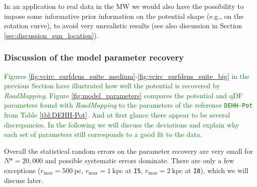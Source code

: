 \documentclass[iop,revtex4,numberedappendix,appendixfloats]{emulateapj}
\newcommand{\RM}{{\sl RoadMapping}}
\newcommand{\NEW}[1]{\textcolor{Green}{#1}}
\newcommand{\hiddenComment}[1]{}
\newcommand{\OLD}[1]{}
\begin{document}
In an application to real data in the MW we would also have the possibility to impose some informative prior information on the potential shape (e.g., on the rotation curve), to avoid very unrealistic results (see also discussion in Section \ref{sec:discussion_sun_location}).

\hiddenComment{[TO DO: Jo writes: "It would be interesting to figure out a little more how we can determine whether we expect the fit to be strongly biased because we are using a volume that it sitting right on top of a massive spiral arm, although that is perhaps best kept for a later paper."]}

\subsubsection{Discussion of the model parameter recovery} \label{sec:parameter recovery}

\NEW{Figures \ref{fig:vcirc_surfdens_suite_medium}-\ref{fig:vcirc_surfdens_suite_big} in the previous Section have illustrated how well the potential is recovered by \RM{}. Figure \ref{fig:model_parameters} compares the potential and qDF parameters found with \RM{} to the parameters of the reference \texttt{DEHH-Pot} from Table \ref{tbl:DEHH-Pot}. And at first glance there appear to be several discrepancies. In the following we will discuss the deviations and explain why each set of parameters still corresponds to a good fit to the data.}

\OLD{Having illustrated in Section \ref{sec:circvel_surfdens} that the potential recovery is qualitatively successful, we will investigate this result more quantitatively in the following two sections. We start here by discussing the recovered best fit potential and qDF parameters for all analyses, which are displayed in Figure \ref{fig:model_parameters}, and compared to the parameters of the reference \texttt{DEHH-Pot} from Table \ref{tbl:DEHH-Pot}.}

Overall the statistical random errors on the parameter recovery are very small for $N*=20,000$ and possible systematic errors dominate. There are only a few exceptions ($r_\text{max}=500~\text{pc}$, $r_\text{max}=1~\text{kpc}$ at \texttt{I5}, $r_\text{max}=2~\text{kpc}$ at \texttt{I8}), which we will discuss later.
\end{document}
